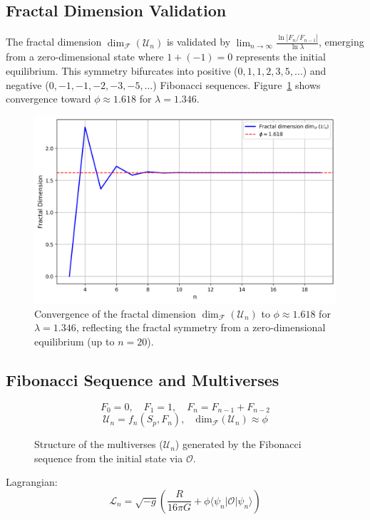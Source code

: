 \documentclass[aps,prl,twocolumn,groupedaddress]{revtex4-2}
\newcommand{\F}[1]{F_{#1}}
\newcommand{\U}[1]{\mathcal{U}_{#1}}
\newcommand{\Opp}{\mathcal{O}}
\newcommand{\dimfrac}{\mathrm{dim}_\mathscr{F}}
\begin{document}
\subsection{Fractal Dimension Validation}
The fractal dimension \(\dim_{\mathscr{F}}(\mathcal{U}_n)\) is validated by \(\lim_{n \to \infty} \frac{\ln |F_n / F_{n-1}|}{\ln \lambda}\), emerging from a zero-dimensional state where \(1 + (-1) = 0\) represents the initial equilibrium. This symmetry bifurcates into positive (\(0, 1, 1, 2, 3, 5, \ldots\)) and negative (\(0, -1, -1, -2, -3, -5, \ldots\)) Fibonacci sequences. Figure~\ref{fig:fractal_dimension} shows convergence toward \(\phi \approx 1.618\) for \(\lambda = 1.346\).

\begin{figure}
    \centering
    \includegraphics[width=\columnwidth]{figures/fractal_dimension.png}
    \caption{Convergence of the fractal dimension \(\dim_{\mathscr{F}}(\mathcal{U}_n)\) to \(\phi \approx 1.618\) for \(\lambda = 1.346\), reflecting the fractal symmetry from a zero-dimensional equilibrium (up to \( n = 20 \)).}
    \label{fig:fractal_dimension}
\end{figure}

\subsection{Fibonacci Sequence and Multiverses}
\begin{equation}
\F{0} = 0, \quad \F{1} = 1, \quad \F{n} = \F{n-1} + \F{n-2}
\label{eq:fibonacci}
\end{equation}
\begin{equation}
\U{n} = f_n(S_p, \F{n}), \quad \dimfrac(\U{n}) \approx \phi
\label{eq:univers}
\end{equation}
\begin{figure}
    \centering
    
    \caption{Structure of the multiverses (\(\U{n}\)) generated by the Fibonacci sequence from the initial state via \(\Opp\).}
    \label{fig:fibonacci}
\end{figure}
Lagrangian:
\begin{equation}
\mathcal{L}_n = \sqrt{-g} \left( \frac{R}{16\pi G} + \phi \langle \psi_n | \Opp | \psi_n \rangle \right)
\label{eq:lagrangian}
\end{equation}
\end{document}
